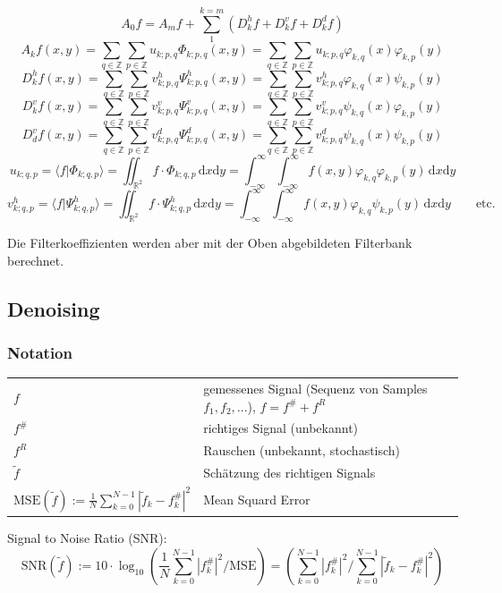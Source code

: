 	\[  
		A_0f = A_mf+\sum_{1}^{k=m}(D_k^hf+D_k^vf+D_k^df)
	\]
	\[  
		A_kf(x,y)=\sum_{q\in\mathbb{Z}}\sum_{p\in \mathbb{Z}}u_{k;p,q}\Phi_{k;p,q}(x,y) = \sum_{q\in\mathbb{Z}}\sum_{p\in \mathbb{Z}}u_{k;p,q} \varphi_{k,q}(x) \varphi_{k,p}(y)
	\]
	\[  
		D_k^hf(x,y)=\sum_{q\in\mathbb{Z}}\sum_{p\in \mathbb{Z}}v_{k;p,q}^h\Psi_{k;p,q}^h(x,y) = \sum_{q\in\mathbb{Z}}\sum_{p\in \mathbb{Z}}v_{k;p,q}^h \varphi_{k,q}(x) \psi_{k,p}(y)
	\]
	\[  
		D_k^vf(x,y)=\sum_{q\in\mathbb{Z}}\sum_{p\in \mathbb{Z}}v_{k;p,q}^v\Psi_{k;p,q}^v(x,y) = \sum_{q\in\mathbb{Z}}\sum_{p\in \mathbb{Z}}v_{k;p,q}^v \psi_{k,q}(x) \varphi_{k,p}(y)
	\]
	\[  
		D_d^vf(x,y)=\sum_{q\in\mathbb{Z}}\sum_{p\in \mathbb{Z}}v_{k;p,q}^d\Psi_{k;p,q}^d(x,y) = \sum_{q\in\mathbb{Z}}\sum_{p\in \mathbb{Z}}v_{k;p,q}^d \psi_{k,q}(x) \psi_{k,p}(y)
	\]		
\[ 
	u_{k;q,p}=\langle f|\Phi_{k;q,p} \rangle = \iint_{\mathbb{R}^2} f \cdot \Phi_{k;q,p} \, \mathrm{d}x\mathrm{d}y = \int_{-\infty}^{\infty} \int_{-\infty}^{\infty} f(x,y) \varphi_{k,q} \varphi_{k,p}(y) \, \mathrm{d}x\mathrm{d}y 
\]
\[
	v_{k;q,p}^h=\langle f|\Psi_{k;q,p}^h \rangle = \iint_{\mathbb{R}^2} f \cdot \Psi_{k;q,p}^h \, \mathrm{d}x\mathrm{d}y = \int_{-\infty}^{\infty} \int_{-\infty}^{\infty} f(x,y) \varphi_{k,q} \psi_{k,p}(y) \, \mathrm{d}x\mathrm{d}y \qquad \text{etc.}
\]

Die Filterkoeffizienten werden aber mit der Oben abgebildeten Filterbank berechnet.


\subsection{Denoising}

\subsubsection{Notation}

\begin{tabular}{ll}
	$f$ & gemessenes Signal (Sequenz von Samples $f_1, f_2,...$), $f=f^\# + f^R$ \\
	$f^\#$ & richtiges Signal (unbekannt) \\
	$f^R$ & Rauschen (unbekannt, stochastisch) \\
	$\tilde{f}$ & Schätzung des richtigen Signals \\
	$\mathrm{MSE}(\tilde{f}) := \frac{1}{N}\sum_{k=0}^{N-1}|\tilde{f}_k - f_k^{\#}|^2$ & Mean Squard Error \\
\end{tabular}

Signal to Noise Ratio (SNR):
\[
	\mathrm{SNR}(\tilde{f}):=10\cdot \log_{10} \left(\frac{1}{N}\sum_{k=0}^{N-1} |f_k^{\#}|^2 / \mathrm{MSE}\right) = \left(\sum_{k=0}^{N-1} |f_k^{\#}|^2 / \sum_{k=0}^{N-1}|\tilde{f}_k - f_k^{\#}|^2\right)
\]

